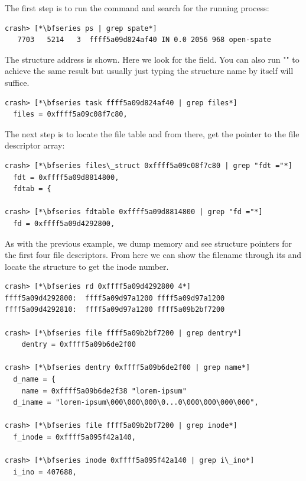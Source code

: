 The first step is to run the  command and search for the running process:

\begin{lstlisting}
crash> [*\bfseries ps | grep spate*]
   7703   5214   3  ffff5a09d824af40 IN 0.0 2056 968 open-spate
\end{lstlisting}

\noindent
The  structure address is shown. Here we look for the  field. You can also run "" to achieve the same result but usually just typing the structure name by itself will suffice.

\begin{lstlisting}
crash> [*\bfseries task ffff5a09d824af40 | grep files*]
  files = 0xffff5a09c08f7c80,
\end{lstlisting}

\noindent
The next step is to locate the file table and from there, get the pointer to the file descriptor array:

\begin{lstlisting}
crash> [*\bfseries files\_struct 0xffff5a09c08f7c80 | grep "fdt ="*]
  fdt = 0xffff5a09d8814800,
  fdtab = {

crash> [*\bfseries fdtable 0xffff5a09d8814800 | grep "fd ="*]
  fd = 0xffff5a09d4292800,
\end{lstlisting}

\noindent
As with the previous example, we dump memory and see  structure pointers for the first four file descriptors. From here we can show the filename through its  and locate the  structure to get the inode number.

\begin{lstlisting}
crash> [*\bfseries rd 0xffff5a09d4292800 4*]
ffff5a09d4292800:  ffff5a09d97a1200 ffff5a09d97a1200 
ffff5a09d4292810:  ffff5a09d97a1200 ffff5a09b2bf7200  

crash> [*\bfseries file ffff5a09b2bf7200 | grep dentry*]
    dentry = 0xffff5a09b6de2f00

crash> [*\bfseries dentry 0xffff5a09b6de2f00 | grep name*]
  d_name = {
    name = 0xffff5a09b6de2f38 "lorem-ipsum"
  d_iname = "lorem-ipsum\000\000\000\0...0\000\000\000\000",

crash> [*\bfseries file ffff5a09b2bf7200 | grep inode*]
  f_inode = 0xffff5a095f42a140,

crash> [*\bfseries inode 0xffff5a095f42a140 | grep i\_ino*]
  i_ino = 407688,
\end{lstlisting}

